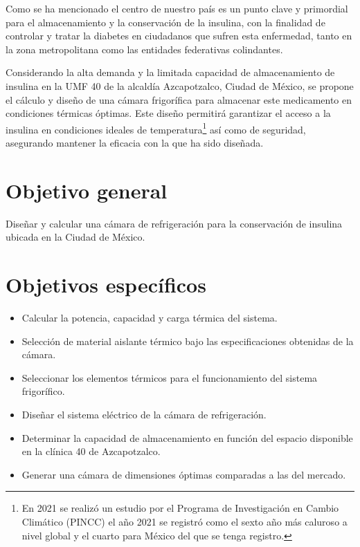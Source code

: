 Como se ha mencionado el centro de nuestro país es un punto clave y primordial para el almacenamiento y la conservación de la insulina, con la finalidad de controlar y tratar la diabetes en ciudadanos que sufren esta enfermedad, tanto en la zona metropolitana como las entidades federativas colindantes.

Considerando la alta demanda y la limitada capacidad de almacenamiento de insulina en la UMF 40 de la alcaldía Azcapotzalco, Ciudad de México, se propone el cálculo y diseño de una cámara frigorífica para almacenar este medicamento en condiciones térmicas óptimas. Este diseño permitirá garantizar el acceso a la insulina en condiciones ideales de temperatura\footnote{En 2021 se realizó un estudio por el Programa de Investigación en Cambio Climático (PINCC) el año 2021 se registró como el sexto año más caluroso a nivel global y el cuarto para México del que se tenga registro.} así como de seguridad, asegurando mantener la eficacia con la que ha sido diseñada. 


\section*{Objetivo general}
Diseñar y calcular una cámara de refrigeración para la conservación de insulina ubicada en la Ciudad de México. 

\section*{Objetivos específicos}

\begin{itemize}
	\item	Calcular la potencia, capacidad y carga térmica del sistema. 
	\item	Selección de material aislante térmico bajo las especificaciones obtenidas de la cámara.
	\item	Seleccionar los elementos térmicos para el funcionamiento del sistema frigorífico.
	\item	Diseñar el sistema eléctrico de la cámara de refrigeración. 
	\item	Determinar la capacidad de almacenamiento en función del espacio disponible en la clínica 40 de Azcapotzalco.
	\item	Generar una cámara de dimensiones óptimas comparadas a las del mercado.
	
\end{itemize}

